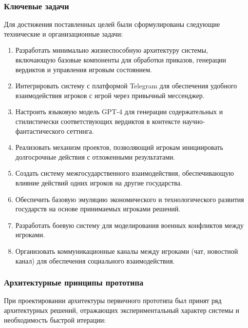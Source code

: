 \subsubsection{Ключевые задачи}

Для достижения поставленных целей были сформулированы следующие технические и организационные задачи:

\begin{enumerate}
    \item Разработать минимально жизнеспособную архитектуру системы, включающую базовые компоненты для обработки приказов, генерации вердиктов и управления игровым состоянием.

    \item Интегрировать систему с платформой Telegram для обеспечения удобного взаимодействия игроков с игрой через привычный мессенджер.

    \item Настроить языковую модель GPT-4 для генерации содержательных и стилистически соответствующих вердиктов в контексте научно-фантастического сеттинга.

    \item Реализовать механизм проектов, позволяющий игрокам инициировать долгосрочные действия с отложенными результатами.

    \item Создать систему межгосударственного взаимодействия, обеспечивающую влияние действий одних игроков на другие государства.

    \item Обеспечить базовую эмуляцию экономического и технологического развития государств на основе принимаемых игроками решений.

    \item Разработать боевую систему для моделирования военных конфликтов между игроками.

    \item Организовать коммуникационные каналы между игроками (чат, новостной канал) для обеспечения социального взаимодействия.
\end{enumerate}

\subsubsection{Архитектурные принципы прототипа}

При проектировании архитектуры первичного прототипа был принят ряд архитектурных решений, отражающих экспериментальный характер системы и необходимость быстрой итерации:

